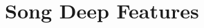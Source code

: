 
\chapter{Song Deep Features}

\label{AppendixB}

\begin{lstlisting}[caption=Song Deep Features]

\end{lstlisting}


